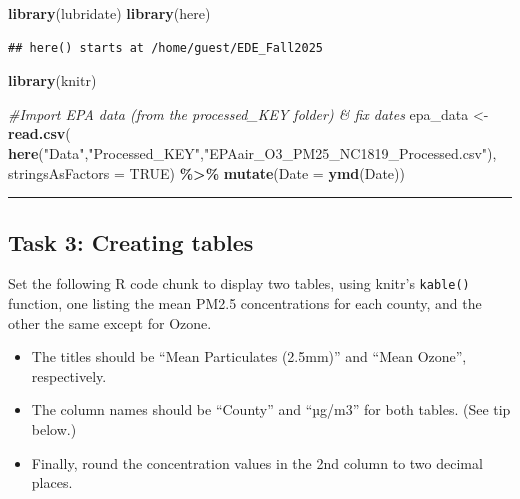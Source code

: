 \documentclass[
]{article}
\newenvironment{Shaded}{\begin{snugshade}}{\end{snugshade}}
\newcommand{\AttributeTok}[1]{\textcolor[rgb]{0.13,0.29,0.53}{#1}}
\newcommand{\CommentTok}[1]{\textcolor[rgb]{0.56,0.35,0.01}{\textit{#1}}}
\newcommand{\ConstantTok}[1]{\textcolor[rgb]{0.56,0.35,0.01}{#1}}
\newcommand{\FunctionTok}[1]{\textcolor[rgb]{0.13,0.29,0.53}{\textbf{#1}}}
\newcommand{\NormalTok}[1]{#1}
\newcommand{\OtherTok}[1]{\textcolor[rgb]{0.56,0.35,0.01}{#1}}
\newcommand{\SpecialCharTok}[1]{\textcolor[rgb]{0.81,0.36,0.00}{\textbf{#1}}}
\newcommand{\StringTok}[1]{\textcolor[rgb]{0.31,0.60,0.02}{#1}}
\providecommand{\tightlist}{%
  \setlength{\itemsep}{0pt}\setlength{\parskip}{0pt}}
\begin{document}
\begin{Shaded}
\begin{Highlighting}[]
\FunctionTok{library}\NormalTok{(lubridate)}
\FunctionTok{library}\NormalTok{(here)}
\end{Highlighting}
\end{Shaded}

\begin{verbatim}
## here() starts at /home/guest/EDE_Fall2025
\end{verbatim}

\begin{Shaded}
\begin{Highlighting}[]
\FunctionTok{library}\NormalTok{(knitr)}

\CommentTok{\#Import EPA data (from the processed\_KEY folder) \& fix dates}
\NormalTok{epa\_data }\OtherTok{\textless{}{-}} \FunctionTok{read.csv}\NormalTok{(}
  \FunctionTok{here}\NormalTok{(}\StringTok{"Data"}\NormalTok{,}\StringTok{"Processed\_KEY"}\NormalTok{,}\StringTok{"EPAair\_O3\_PM25\_NC1819\_Processed.csv"}\NormalTok{),}
  \AttributeTok{stringsAsFactors =} \ConstantTok{TRUE}\NormalTok{) }\SpecialCharTok{\%\textgreater{}\%} 
  \FunctionTok{mutate}\NormalTok{(}\AttributeTok{Date =} \FunctionTok{ymd}\NormalTok{(Date))}
\end{Highlighting}
\end{Shaded}

\begin{center}\rule{0.5\linewidth}{0.5pt}\end{center}

\subsection{Task 3: Creating tables}\label{task-3-creating-tables}

Set the following R code chunk to display two tables, using knitr's
\texttt{kable()} function, one listing the mean PM2.5 concentrations for
each county, and the other the same except for Ozone.

\begin{itemize}
\tightlist
\item
  The titles should be ``Mean Particulates (2.5mm)'' and ``Mean Ozone'',
  respectively.
\item
  The column names should be ``County'' and ``µg/m3'' for both tables.
  (See tip below.)
\item
  Finally, round the concentration values in the 2nd column to two
  decimal places.
\end{itemize}
\end{document}
